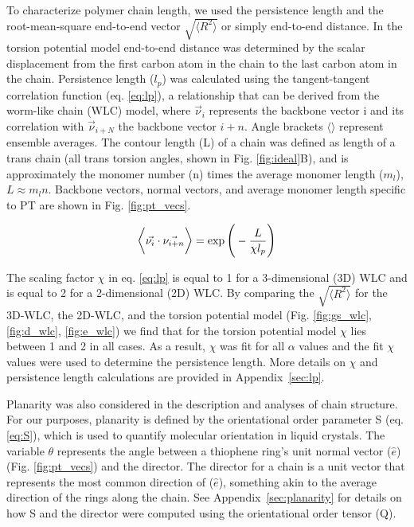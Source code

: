 To characterize polymer chain length, we used the persistence length and the root-mean-square end-to-end vector $\sqrt{\big \langle R^2 \big \rangle}$ or simply end-to-end distance. In the torsion potential model end-to-end distance was determined by the scalar displacement from the first carbon atom in the chain to the last carbon atom in the chain. Persistence length ($l_p$) was calculated using the tangent-tangent correlation function (eq. \ref{eq:lp}), a relationship that can be derived from the worm-like chain (WLC) model, where $\vec{\nu}_i$ represents the backbone vector i and its correlation with $\vec{\nu}_{i+N}$ the backbone vector $i+n$. Angle brackets $\big \langle \big \rangle$ represent ensemble averages. The contour length (L) of a chain was defined as length of a trans chain (all trans torsion angles, shown in Fig. \ref{fig:ideal}B), and is approximately the monomer number (n) times the average monomer length ($m_l$), $L \approx m_ln$. Backbone vectors, normal vectors, and average monomer length specific to PT are shown in Fig. \ref{fig:pt_vecs}.

\begin{equation}
\large
\Big \langle \large \Vec{\nu_i} \cdot \Vec{\nu_{i+n}} \Big \rangle = \exp{\bigg(-\frac{L}{\chi l_p}\bigg)}
\label{eq:lp}
\end{equation}

The scaling factor $\chi$ in eq. \ref{eq:lp} is equal to 1 for a 3-dimensional (3D) WLC and is equal to 2 for a 2-dimensional (2D) WLC.\cite{Meyer2016} By comparing the $\sqrt{\big \langle R^2 \big \rangle}$ for the 3D-WLC, the 2D-WLC, and the torsion potential model (Fig. \ref{fig:gs_wlc}, \ref{fig:d_wlc}, \ref{fig:e_wlc}) we find that for the torsion potential model $\chi$ lies between 1 and 2 in all cases. As a result, $\chi$ was fit for all $\alpha$ values and the fit $\chi$ values were used to determine the persistence length. More details on $\chi$ and persistence length calculations are provided in Appendix~\ref{sec:lp}.

Planarity was also considered in the description and analyses of chain structure. For our purposes, planarity is defined by the orientational order parameter S (eq. \ref{eq:S}),\cite{Allen2017} which is used to quantify molecular orientation in liquid crystals. The variable $\theta$ represents the angle between a thiophene ring's unit normal vector ($\hat{e}$) (Fig. \ref{fig:pt_vecs}) and the director. The director for a chain is a unit vector that represents the most common direction of ($\hat{e}$), something akin to the average direction of the rings along the chain. See Appendix~\ref{sec:planarity} for details on how S and the director were computed using the orientational order tensor (Q).

